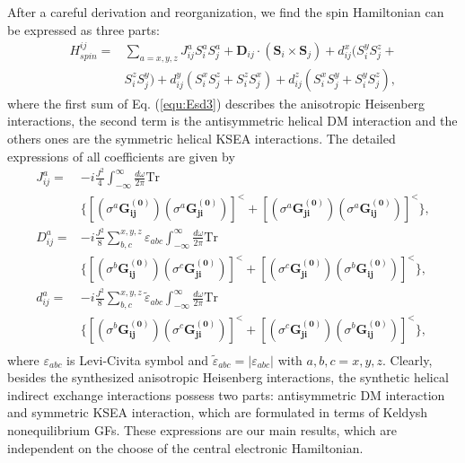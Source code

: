 \documentclass[aps,prb,twocolumn,showpacs,amssymb]{revtex4-1}
\begin{document}
After a careful derivation and reorganization, we find the spin Hamiltonian can be expressed as three parts:
\begin{equation}\label{equ:Esd3}
\begin{aligned}
H_{spin}^{ij}=&\sum\limits_{a=x,y,z}J^{a}_{ij}S^a_iS^a_j+\bm{D}_{ij}\cdot(\bm{S}_{i}\times\bm{S}_{j})+d^x_{ij}(S^y_iS^z_j+\\
&S^z_iS^y_j)+d^y_{ij}(S^x_iS^z_j+S^z_iS^x_j)+d^z_{ij}(S^x_iS^y_j+S^y_iS^z_j),
\end{aligned}
\end{equation}
where the first sum of Eq. (\ref{equ:Esd3}) describes the anisotropic Heisenberg interactions, the second term is the antisymmetric helical DM interaction and the others ones are the symmetric helical KSEA interactions. The detailed expressions of all coefficients are given by
\begin{equation}\label{equ:JD}
\begin{aligned}
J^{a}_{ij}=&-i\frac{J^2}{4}\int^{\infty}_{-\infty}\frac{d\omega}{2\pi}\mathrm{Tr}\\
&\{[(\sigma^{a}\bm{G^{(0)}_{ij}})(\sigma^{a}\bm{G^{(0)}_{ji}})]^{<}
+[(\sigma^{a}\bm{G^{(0)}_{ji}})(\sigma^{a}\bm{G^{(0)}_{ij}})]^{<}\},\\
D^{a}_{ij}=&-i\frac{J^2}{8}\sum\limits_{b,c}^{x,y,z}\varepsilon_{abc}\int^{\infty}_{-\infty}\frac{d\omega}{2\pi}\mathrm{Tr}\\
&\{[(\sigma^{b}\bm{G^{(0)}_{ij}})(\sigma^{c}\bm{G^{(0)}_{ji}})]^{<}
+[(\sigma^{c}\bm{G^{(0)}_{ji}})(\sigma^{b}\bm{G^{(0)}_{ij}})]^{<}\},\\
d^{a}_{ij}=&-i\frac{J^2}{8}\sum\limits_{b,c}^{x,y,z}\tilde{{\varepsilon}}_{abc}\int^{\infty}_{-\infty}\frac{d\omega}{2\pi}\mathrm{Tr}\\
&\{[(\sigma^{b}\bm{G^{(0)}_{ij}})(\sigma^{c}\bm{G^{(0)}_{ji}})]^{<}
+[(\sigma^{c}\bm{G^{(0)}_{ji}})(\sigma^{b}\bm{G^{(0)}_{ij}})]^{<}\}, \\
\end{aligned}
\end{equation}
where $\varepsilon_{abc}$ is Levi-Civita symbol and $\tilde{{\varepsilon}}_{abc}=|{\varepsilon}_{abc}|$ with $a, b, c=x, y, z$.
Clearly, besides the synthesized anisotropic Heisenberg interactions, the synthetic helical indirect exchange interactions possess two parts: antisymmetric DM interaction and symmetric KSEA interaction, which are formulated in terms of Keldysh nonequilibrium GFs. These expressions are our main results, which are independent on the choose of the central electronic Hamiltonian.
\end{document}
